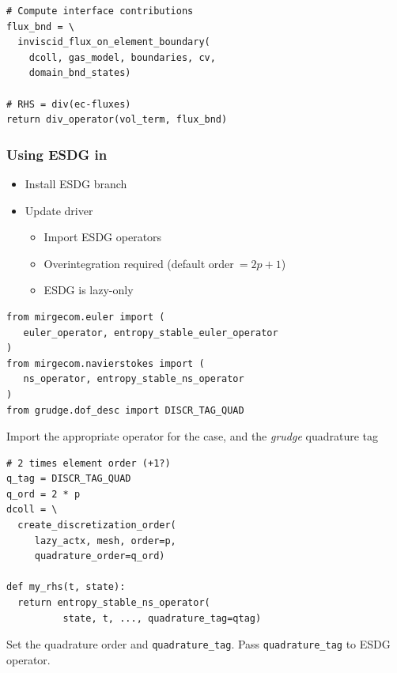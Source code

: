\begin{frame}[fragile]
\begin{multicols}{2}
\begin{lstlisting}
# Compute interface contributions
flux_bnd = \
  inviscid_flux_on_element_boundary(
    dcoll, gas_model, boundaries, cv,
    domain_bnd_states)

# RHS = div(ec-fluxes) 
return div_operator(vol_term, flux_bnd)

\end{lstlisting}
\end{multicols}
\end{frame}

\begin{frame}[fragile]
  \frametitle{Using ESDG in \mirgecom{}}
  \begin{minipage}[b]{0.48\textwidth}
    \begin{itemize}
      \item Install \mirgecom{} ESDG branch
      \item Update \mirgecom{} driver
      \begin{itemize}
        \item Import ESDG operators
        \item Overintegration required (default order$~=\!2p\!+\!1$)
        \item ESDG is lazy-only
      \end{itemize}
    \end{itemize}
  \end{minipage}\hfill
  \begin{minipage}[b]{0.48\textwidth}
    \centering
\begin{lstlisting}
from mirgecom.euler import (
   euler_operator, entropy_stable_euler_operator
)
from mirgecom.navierstokes import (
   ns_operator, entropy_stable_ns_operator
)
from grudge.dof_desc import DISCR_TAG_QUAD
\end{lstlisting}
    \tiny Import the appropriate operator for the case, and the \textit{grudge} quadrature tag
\begin{lstlisting}
# 2 times element order (+1?)
q_tag = DISCR_TAG_QUAD
q_ord = 2 * p
dcoll = \
  create_discretization_order(
     lazy_actx, mesh, order=p,
     quadrature_order=q_ord)

def my_rhs(t, state):
  return entropy_stable_ns_operator(
          state, t, ..., quadrature_tag=qtag)
\end{lstlisting}
    \tiny Set the quadrature order and \texttt{quadrature\_tag}. Pass \texttt{quadrature\_tag} to ESDG operator.
  \end{minipage}
\end{frame}

